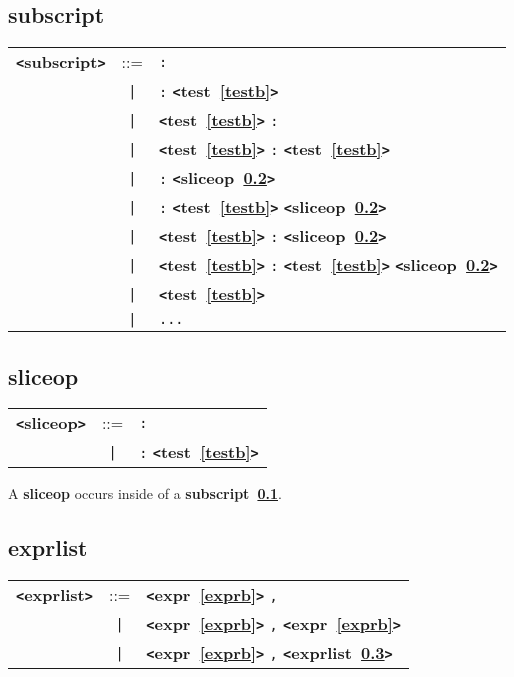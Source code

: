 \documentclass[12pt]{article}
\begin{document}
\subsection{subscript}
\label{subscriptb}
\begin{tabular}{lcl}
{\bf \verb+<+subscript\verb+>+} & ::=  & \verb|:| \\
 & \verb+|+  & \verb|:| {\bf \verb+<+test~\ref{testb}\verb+>+}  \\
 & \verb+|+  & {\bf \verb+<+test~\ref{testb}\verb+>+}  \verb|:| \\
 & \verb+|+  & {\bf \verb+<+test~\ref{testb}\verb+>+}  \verb|:| {\bf \verb+<+test~\ref{testb}\verb+>+}  \\
 & \verb+|+  & \verb|:| {\bf \verb+<+sliceop~\ref{sliceopb}\verb+>+}  \\
 & \verb+|+  & \verb|:| {\bf \verb+<+test~\ref{testb}\verb+>+}  {\bf \verb+<+sliceop~\ref{sliceopb}\verb+>+}  \\
 & \verb+|+  & {\bf \verb+<+test~\ref{testb}\verb+>+}  \verb|:| {\bf \verb+<+sliceop~\ref{sliceopb}\verb+>+}  \\
 & \verb+|+  & {\bf \verb+<+test~\ref{testb}\verb+>+}  \verb|:| {\bf \verb+<+test~\ref{testb}\verb+>+}  {\bf \verb+<+sliceop~\ref{sliceopb}\verb+>+}  \\
 & \verb+|+  & {\bf \verb+<+test~\ref{testb}\verb+>+}  \\
 & \verb+|+  & \verb|...| \\
\end{tabular}

\subsection{sliceop}
\label{sliceopb}
\begin{tabular}{lcl}
{\bf \verb+<+sliceop\verb+>+} & ::=  & \verb|:| \\
 & \verb+|+  & \verb|:| {\bf \verb+<+test~\ref{testb}\verb+>+}  \\
\end{tabular}

A {\bf sliceop} occurs inside of a {\bf subscript~\ref{subscriptb}}.

\subsection{exprlist}
\label{exprlistb}
\begin{tabular}{lcl}
{\bf \verb+<+exprlist\verb+>+} & ::=  & {\bf \verb+<+expr~\ref{exprb}\verb+>+}  \verb|,| \\
 & \verb+|+  & {\bf \verb+<+expr~\ref{exprb}\verb+>+}  \verb|,| {\bf \verb+<+expr~\ref{exprb}\verb+>+}  \\
 & \verb+|+  & {\bf \verb+<+expr~\ref{exprb}\verb+>+}  \verb|,| {\bf \verb+<+exprlist~\ref{exprlistb}\verb+>+}  \\
\end{tabular}
\end{document}
